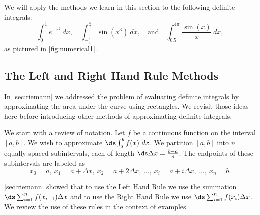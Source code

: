 We will apply the methods we learn in this section to the following definite integrals:
\[
 \int_0^1 e^{-x^2} \ dx, \quad
 \int_{-\frac{\pi}{4}}^{\frac{\pi}{2}} \sin(x^3) \ dx,
 \quad \text{and} \quad
 \int_{0.5}^{4\pi} \frac{\sin(x)}{x} \ dx,
\]
as pictured in \autoref{fig:numerical1}.

\subsection{The Left and Right Hand Rule Methods}

In \autoref{sec:riemann} we addressed the problem of evaluating definite integrals by approximating the area under the curve using rectangles. We revisit those ideas here before introducing other methods of approximating definite integrals. 

We start with a review of notation. Let $f$ be a continuous function on the interval $[a,b]$. We wish to approximate $\ds \int_a^b f(x)\ dx$. We partition $[a,b]$ into $n$ equally spaced subintervals, each of length $\ds\Delta x = \frac{b-a}{n}$. The endpoints of these subintervals are labeled as
\[x_0=a,\ x_1 = a+\Delta x,\ x_2 = a+ 2\Delta x,\ \dotsc,\ x_i = a+i\Delta x,\ \dotsc,\ x_n = b.\]

\autoref{sec:riemann} showed that to use the Left Hand Rule we use the summation $\ds \sum_{i=1}^n f(x_{i-1})\Delta x$ and to use the Right Hand Rule we use $\ds \sum_{i=1}^n f(x_i)\Delta x$. We review the use of these rules in the context of examples.

